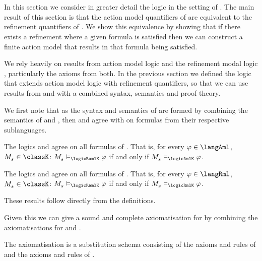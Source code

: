 \section{\classK{}}\label{aaml-k}

In this section we consider in greater detail the logic \logicAamlK{} in the setting of \classK{}.
The main result of this section is that the action model quantifiers of \logicAamlK{} are equivalent to the refinement quantifiers of \logicRmlK{}.
We show this equivalence by showing that if there exists a refinement where a given formula is satisfied then we can construct a finite action model that results in that formula being satisfied.

We rely heavily on results from action model logic \logicAmlK{} and the refinement modal logic \logicRmlK{}, particularly the axioms from both.
In the previous section we defined the logic \logicRamlK{} that extends action model logic with refinement quantifiers, so that we can use results from \logicAmlK{} and \logicRmlK{} with a combined syntax, semantics and proof theory.

We first note that as the syntax and semantics of \logicRamlK{} are formed by combining the semantics of \logicAmlK{} and \logicRmlK{}, then \logicAmlK{} and \logicRmlK{} agree with \logicRamlK{} on formulas from their respective sublanguages.

\begin{lemma}\label{raml-k-aml}
The logics \logicRamlK{} and \logicAmlK{} agree on all formulas of \langAml{}.
That is, for every $\phi \in \langAml$, $\kPModel{\kStateS} \in \classK$: $\kPModel{\kStateS} \entails_\logicRamlK \phi$ if and only if $\kPModel{\kStateS} \entails_\logicAmlK \phi$.
\end{lemma}

\begin{lemma}\label{raml-k-rml}
The logics \logicRamlK{} and \logicAmlK{} agree on all formulas of \langRml{}.
That is, for every $\phi \in \langRml$, $\kPModel{\kStateS} \in \classK$: $\kPModel{\kStateS} \entails_\logicRamlK \phi$ if and only if $\kPModel{\kStateS} \entails_\logicRmlK \phi$.
\end{lemma}

These results follow directly from the definitions.

Given this we can give a sound and complete axiomatisation for \logicRamlK{} by combining the axiomatisations for \logicAmlK{} and \logicRmlK{}.

\begin{definition}\label{raml-k-axiomatisation}
The axiomatisation \axiomAamlK{} is a substitution schema consisting of the axioms and rules of \axiomAmlK{} and the axioms and rules of \axiomRmlK{}.
\end{definition}

